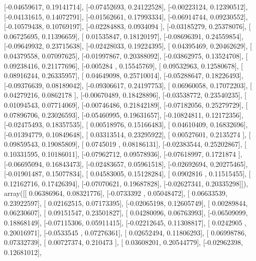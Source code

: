 \documentclass{article}
\begin{document}
       [-0.04659617,  0.19141714],
       [-0.07452693,  0.24122528],
       [-0.00223124,  0.12390512],
       [-0.04131615,  0.14072791],
       [-0.01562661,  0.17993334],
       [-0.06914744,  0.09230552],
       [-0.10579438,  0.10769197],
       [-0.02284883,  0.0934094 ],
       [-0.03185279,  0.25378076],
       [ 0.06725695,  0.11396659],
       [ 0.01535847,  0.18120197],
       [-0.08696391,  0.24559854],
       [-0.09649932,  0.23715638],
       [-0.02428033,  0.19224395],
       [ 0.04395469,  0.20462629],
       [ 0.04379558,  0.07097625],
       [-0.01997867,  0.20388092],
       [-0.03862975,  0.13524708],
       [ 0.09238416,  0.21177696],
       [-0.005284  ,  0.15545769],
       [ 0.09532963,  0.12580678],
       [ 0.08916244,  0.26335957],
       [ 0.04649098,  0.25710014],
       [-0.05288647,  0.18226493],
       [-0.09376639,  0.08189042],
       [-0.09306617,  0.24197753],
       [ 0.06960058,  0.17072203],
       [ 0.04279216,  0.0862178 ],
       [-0.00670489,  0.18428896],
       [-0.03538772,  0.23540235],
       [ 0.01094543,  0.07714069],
       [-0.00746486,  0.21842189],
       [-0.07182056,  0.25279729],
       [ 0.07896706,  0.23026593],
       [-0.05460995,  0.19631657],
       [-0.10824811,  0.12172356],
       [-0.02475493,  0.18357535],
       [ 0.00518976,  0.15166483],
       [ 0.04610409,  0.16832696],
       [-0.01394779,  0.10849648],
       [ 0.03313514,  0.23295922],
       [ 0.00527601,  0.2135274 ],
       [ 0.09859543,  0.19085809],
       [ 0.0745019 ,  0.08186131],
       [-0.02383544,  0.25202867],
       [ 0.10331595,  0.10186011],
       [-0.07962712,  0.09578936],
       [-0.07618997,  0.1721874 ],
       [-0.06695094,  0.16843473],
       [-0.02483657,  0.05961518],
       [-0.02692694,  0.20275465],
       [-0.01901487,  0.15077834],
       [ 0.04583005,  0.15128284],
       [ 0.0902816 ,  0.11515455],
       [ 0.12162716,  0.17426394],
       [-0.07070621,  0.19687828],
       [-0.02627341,  0.20335298]]), array([[ 0.06386964,  0.08321776],
       [-0.0733392 ,  0.05048472],
       [ 0.06633539,  0.23922597],
       [ 0.02162515,  0.07173395],
       [-0.02065198,  0.12605749],
       [ 0.00289844,  0.06230607],
       [ 0.09151547,  0.23501827],
       [ 0.04280096,  0.06763993],
       [-0.06509099,  0.18868149],
       [-0.07115306,  0.05911415],
       [-0.02212645,  0.11308817],
       [ 0.0242905 ,  0.20016971],
       [-0.0533545 ,  0.07276361],
       [ 0.02652494,  0.11806293],
       [ 0.06998786,  0.07332739],
       [ 0.00727374,  0.210473  ],
       [ 0.03608201,  0.20544779],
       [-0.02962398,  0.12681012],
\end{document}
